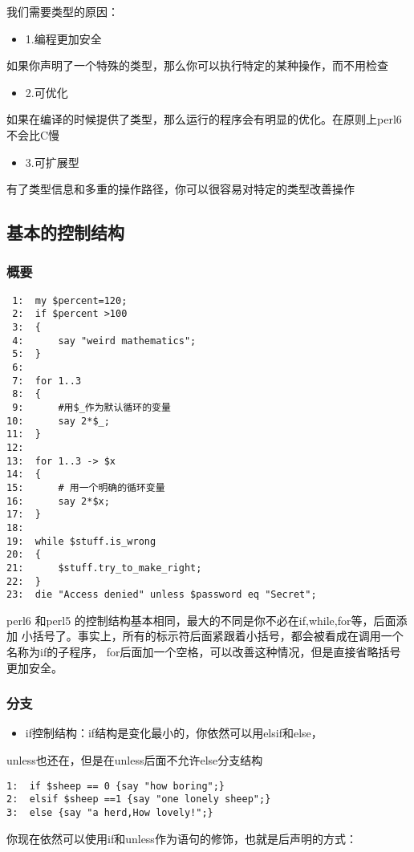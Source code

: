 \documentclass{ctexart}
\begin{document}
我们需要类型的原因：
\begin{itemize}
\item 1.编程更加安全
\end{itemize}
如果你声明了一个特殊的类型，那么你可以执行特定的某种操作，而不用检查
\begin{itemize}
\item 2.可优化
\end{itemize}
如果在编译的时候提供了类型，那么运行的程序会有明显的优化。在原则上perl6
不会比C慢
\begin{itemize}
\item 3.可扩展型
\end{itemize}
有了类型信息和多重的操作路径，你可以很容易对特定的类型改善操作
\subsection{基本的控制结构}
\label{sec-4-4}
\subsubsection{概要}
\label{sec-4-4-1}


\begin{lstlisting}
 1:  my $percent=120;
 2:  if $percent >100
 3:  {
 4:      say "weird mathematics";
 5:  }
 6:  
 7:  for 1..3
 8:  {
 9:      #用$_作为默认循环的变量
10:      say 2*$_;
11:  }
12:  
13:  for 1..3 -> $x
14:  {
15:      # 用一个明确的循环变量
16:      say 2*$x;
17:  }
18:  
19:  while $stuff.is_wrong
20:  {
21:      $stuff.try_to_make_right;
22:  }
23:  die "Access denied" unless $password eq "Secret";
\end{lstlisting}
perl6 和perl5 的控制结构基本相同，最大的不同是你不必在if,while,for等，后面添加
小括号了。事实上，所有的标示符后面紧跟着小括号，都会被看成在调用一个名称为if的子程序，
for后面加一个空格，可以改善这种情况，但是直接省略括号更加安全。
\subsubsection{分支}
\label{sec-4-4-2}

\begin{itemize}
\item if控制结构：if结构是变化最小的，你依然可以用elsif和else，
\end{itemize}
unless也还在，但是在unless后面不允许else分支结构

\begin{lstlisting}
1:  if $sheep == 0 {say "how boring";}
2:  elsif $sheep ==1 {say "one lonely sheep";}
3:  else {say "a herd,How lovely!";}
\end{lstlisting}
你现在依然可以使用if和unless作为语句的修饰，也就是后声明的方式：
\end{document}
